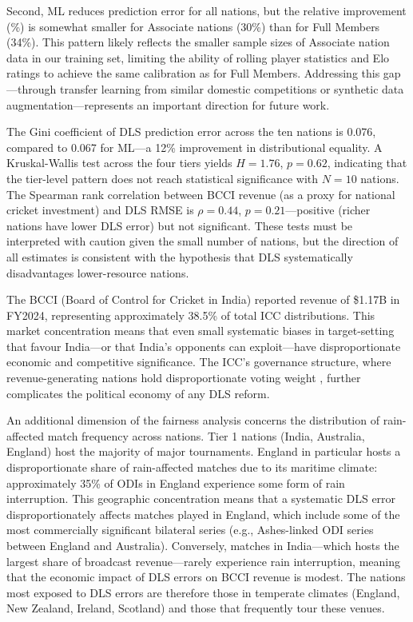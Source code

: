 \documentclass[10pt,a4paper,twocolumn]{article}
\begin{document}
Second, ML reduces prediction error for all nations, but the relative improvement (\%) is somewhat smaller for Associate nations (30\%) than for Full Members (34\%). This pattern likely reflects the smaller sample sizes of Associate nation data in our training set, limiting the ability of rolling player statistics and Elo ratings to achieve the same calibration as for Full Members. Addressing this gap---through transfer learning from similar domestic competitions or synthetic data augmentation---represents an important direction for future work.

The Gini coefficient of DLS prediction error across the ten nations is 0.076, compared to 0.067 for ML---a 12\% improvement in distributional equality. A Kruskal-Wallis test across the four tiers yields $H = 1.76$, $p = 0.62$, indicating that the tier-level pattern does not reach statistical significance with $N = 10$ nations. The Spearman rank correlation between BCCI revenue (as a proxy for national cricket investment) and DLS RMSE is $\rho = 0.44$, $p = 0.21$---positive (richer nations have lower DLS error) but not significant. These tests must be interpreted with caution given the small number of nations, but the direction of all estimates is consistent with the hypothesis that DLS systematically disadvantages lower-resource nations.

The BCCI (Board of Control for Cricket in India) reported revenue of \$1.17B in FY2024, representing approximately 38.5\% of total ICC distributions. This market concentration means that even small systematic biases in target-setting that favour India---or that India's opponents can exploit---have disproportionate economic and competitive significance. The ICC's governance structure, where revenue-generating nations hold disproportionate voting weight \citep{ICC2023prizes}, further complicates the political economy of any DLS reform.

An additional dimension of the fairness analysis concerns the distribution of rain-affected match frequency across nations. Tier 1 nations (India, Australia, England) host the majority of major tournaments. England in particular hosts a disproportionate share of rain-affected matches due to its maritime climate: approximately 35\% of ODIs in England experience some form of rain interruption. This geographic concentration means that a systematic DLS error disproportionately affects matches played in England, which include some of the most commercially significant bilateral series (e.g., Ashes-linked ODI series between England and Australia). Conversely, matches in India---which hosts the largest share of broadcast revenue---rarely experience rain interruption, meaning that the economic impact of DLS errors on BCCI revenue is modest. The nations most exposed to DLS errors are therefore those in temperate climates (England, New Zealand, Ireland, Scotland) and those that frequently tour these venues.
\end{document}
